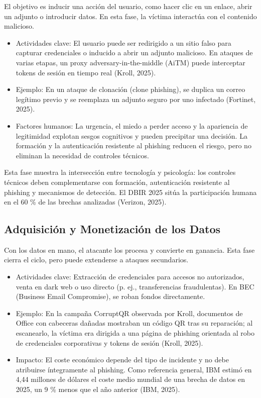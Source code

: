 \documentclass[11pt,a4paper,oneside]{report}
\begin{document}
El objetivo es inducir una acción del usuario, como hacer clic en un enlace, abrir un adjunto o introducir datos. En esta fase, la víctima interactúa con el contenido malicioso.

\begin{itemize}
  \item Actividades clave: El usuario puede ser redirigido a un sitio falso para capturar credenciales o inducido a abrir un adjunto malicioso. En ataques de varias etapas, un proxy adversary-in-the-middle (AiTM) puede interceptar tokens de sesión en tiempo real (Kroll, 2025).
  \item Ejemplo: En un ataque de clonación (clone phishing), se duplica un correo legítimo previo y se reemplaza un adjunto seguro por uno infectado (Fortinet, 2025).
  \item Factores humanos: La urgencia, el miedo a perder acceso y la apariencia de legitimidad explotan sesgos cognitivos y pueden precipitar una decisión. La formación y la autenticación resistente al phishing reducen el riesgo, pero no eliminan la necesidad de controles técnicos.
\end{itemize}

Esta fase muestra la intersección entre tecnología y psicología: los controles técnicos deben complementarse con formación, autenticación resistente al phishing y mecanismos de detección. El DBIR 2025 sitúa la participación humana en el 60 \% de las brechas analizadas (Verizon, 2025).

\subsection{Adquisición y Monetización de los Datos}

Con los datos en mano, el atacante los procesa y convierte en ganancia. Esta fase cierra el ciclo, pero puede extenderse a ataques secundarios.

\begin{itemize}
  \item Actividades clave: Extracción de credenciales para accesos no autorizados, venta en dark web o uso directo (p. ej., transferencias fraudulentas). En BEC (Business Email Compromise), se roban fondos directamente.
  \item Ejemplo: En la campaña CorruptQR observada por Kroll, documentos de Office con cabeceras dañadas mostraban un código QR tras su reparación; al escanearlo, la víctima era dirigida a una página de phishing orientada al robo de credenciales corporativas y tokens de sesión (Kroll, 2025).
  \item Impacto: El coste económico depende del tipo de incidente y no debe atribuirse íntegramente al phishing. Como referencia general, IBM estimó en 4,44 millones de dólares el coste medio mundial de una brecha de datos en 2025, un 9 \% menos que el año anterior (IBM, 2025).
\end{itemize}
\end{document}
